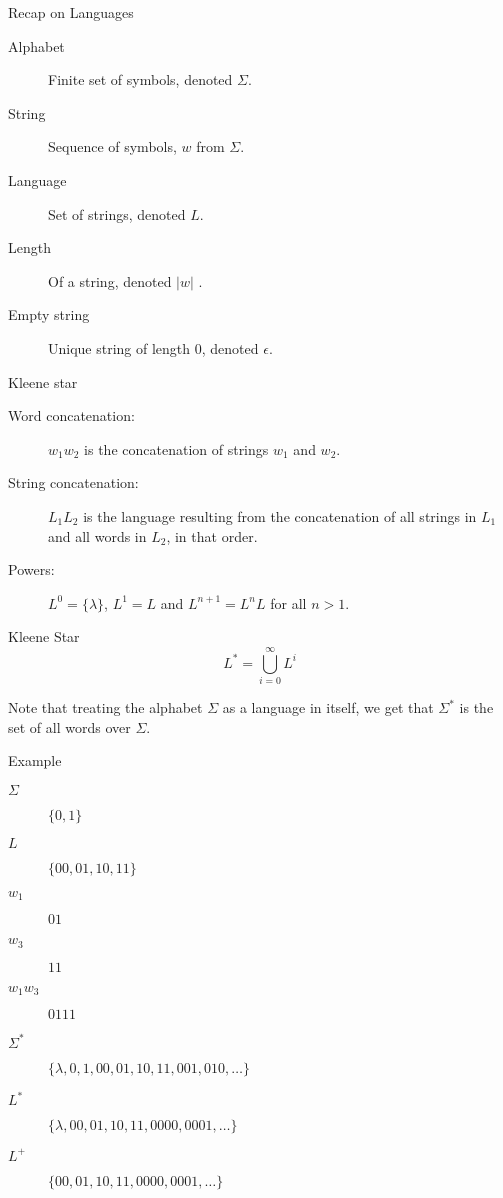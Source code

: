 \begin{frame}{Recap on Languages}
  \begin{description}
    \item[Alphabet] Finite set of symbols, denoted $\Sigma$.
    \item[String] Sequence of symbols, $w$ from $\Sigma$.
    \item[Language] Set of strings, denoted $L$.
    \item[Length] Of a string, denoted $|w|$  .
    \item[Empty string] Unique string of length 0, denoted $\epsilon$.
  \end{description}
\end{frame}


\begin{frame}{Kleene star}
  \begin{description}
    \item[Word concatenation:] $w_1 w_2$ is the concatenation of strings $w_1$ and $w_2$.
    \item[String concatenation:] $L_1 L_2$ is the language resulting from the concatenation of all strings in $L_1$ and all words in $L_2$, in that order.
    \item[Powers:] $L^0 = \{ \lambda \}$, $L^1 = L$ and $L^{n+1} = L^n L$ for all $n > 1$.
  \end{description}
  \vspace{0.5cm}
  \begin{block}{Kleene Star}
     \[ L^* =  \bigcup_{i=0}^{\infty} L^i \]
  \end{block}
  Note that treating the alphabet $\Sigma$ as a language in itself, we get that $\Sigma^*$ is the set of all words over $\Sigma$.
\end{frame}


\begin{frame}{Example}
  \begin{description}
    \item[$\Sigma$] $\{ 0, 1 \}$
    \item[$L$] $\{ 00, 01, 10, 11 \}$
    \item[$w_1$] $01$
    \item[$w_3$] $11$
    \item[$w_1 w_3$] $0111$
    \item[$\Sigma^*$] $\{ \lambda, 0, 1, 00, 01, 10, 11, 001, 010, \ldots \}$
    \item[$L^*$] $\{ \lambda, 00, 01, 10, 11, 0000, 0001, \ldots \}$
    \item[$L^+$] $\{ 00, 01, 10, 11, 0000, 0001, \ldots \}$
  \end{description}
\end{frame}


